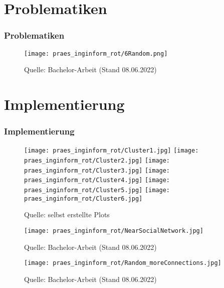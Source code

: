 \documentclass[notes=show]{beamer}
\begin{document}
\section{Problematiken}
\begin{frame}
\vspace{-2.6cm}
\vspace{2.5cm}
  \frametitle{Problematiken}
  \begin{figure}
  \hspace{-2.5cm}
    \texttt{[image: praes\_inginform\_rot/6Random.png]}
    \caption{\tiny{Quelle: Bachelor-Arbeit (Stand 08.06.2022)}}
    \label{fig:my_label}
\end{figure}
 
\end{frame}

\section{Implementierung}
\begin{frame}
  \frametitle{Implementierung}
\vspace{-2.6cm}
\vspace{2.0cm}
  \begin{figure}
  \centering
    \texttt{[image: praes\_inginform\_rot/Cluster1.jpg]}
    \texttt{[image: praes\_inginform\_rot/Cluster2.jpg]}
    \texttt{[image: praes\_inginform\_rot/Cluster3.jpg]}
    \texttt{[image: praes\_inginform\_rot/Cluster4.jpg]}
    \texttt{[image: praes\_inginform\_rot/Cluster5.jpg]}
    \texttt{[image: praes\_inginform\_rot/Cluster6.jpg]}
    \caption{\tiny{Quelle: selbst erstellte Plots}}
    \label{fig:my_label}
\end{figure}
\end{frame}

\begin{frame}
\vspace{-2.6cm}
\vspace{2.0cm}
  \begin{figure}
  \centering
    \texttt{[image: praes\_inginform\_rot/NearSocialNetwork.jpg]}
    \caption{\tiny{Quelle: Bachelor-Arbeit (Stand 08.06.2022)}}
    \label{fig:my_label}
\end{figure}
\end{frame}

\begin{frame}
\vspace{-2.6cm}
\vspace{2.0cm}
  \begin{figure}
  \centering
    \texttt{[image: praes\_inginform\_rot/Random\_moreConnections.jpg]}
    \caption{\tiny{Quelle: Bachelor-Arbeit (Stand 08.06.2022)}}
    \label{fig:my_label}
\end{figure}
\end{frame}
\end{document}
